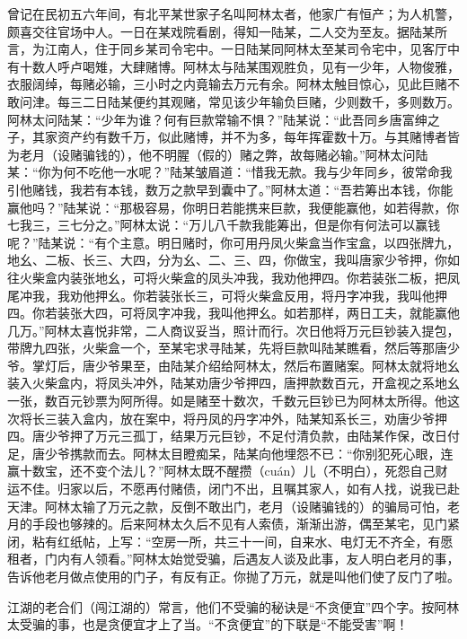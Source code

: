 \documentclass[12pt,UTF8]{ctexbook}
\begin{document}
曾记在民初五六年间，有北平某世家子名叫阿林太者，他家广有恒产；为人机警，颇喜交往官场中人。一日在某戏院看剧，得知一陆某，二人交为至友。据陆某所言，为江南人，住于同乡某司令宅中。一日陆某同阿林太至某司令宅中，见客厅中有十数人呼卢喝雉，大肆赌博。阿林太与陆某围观胜负，见有一少年，人物俊雅，衣服阔绰，每赌必输，三小时之内竟输去万元有余。阿林太触目惊心，见此巨赌不敢问津。每三二日陆某便约其观赌，常见该少年输负巨赌，少则数千，多则数万。阿林太问陆某：“少年为谁？何有巨款常输不惧？”陆某说：“此吾同乡唐富绅之子，其家资产约有数千万，似此赌博，并不为多，每年挥霍数十万。与其赌博者皆为老月（设赌骗钱的），他不明腥（假的）赌之弊，故每赌必输。”阿林太问陆某：“你为何不吃他一水呢？”陆某皱眉道：“惜我无款。我与少年同乡，彼常命我引他赌钱，我若有本钱，数万之款早到囊中了。”阿林太道：“吾若筹出本钱，你能赢他吗？”陆某说：“那极容易，你明日若能携来巨款，我便能赢他，如若得款，你七我三，三七分之。”阿林太说：“万儿八千款我能筹出，但是你有何法可以赢钱呢？”陆某说：“有个主意。明日赌时，你可用丹凤火柴盒当作宝盒，以四张牌九，地幺、二板、长三、大四，分为幺、二、三、四，你做宝，我叫唐家少爷押，你如往火柴盒内装张地幺，可将火柴盒的凤头冲我，我劝他押四。你若装张二板，把凤尾冲我，我劝他押幺。你若装张长三，可将火柴盒反用，将丹字冲我，我叫他押四。你若装张大四，可将凤字冲我，我叫他押幺。如若那样，两日工夫，就能赢他几万。”阿林太喜悦非常，二人商议妥当，照计而行。次日他将万元巨钞装入提包，带牌九四张，火柴盒一个，至某宅求寻陆某，先将巨款叫陆某瞧看，然后等那唐少爷。掌灯后，唐少爷果至，由陆某介绍给阿林太，然后布置赌案。阿林太就将地幺装入火柴盒内，将凤头冲外，陆某劝唐少爷押四，唐押款数百元，开盒视之系地幺一张，数百元钞票为阿所得。如是赌至十数次，千数元巨钞已为阿林太所得。他这次将长三装入盒内，放在案中，将丹凤的丹字冲外，陆某知系长三，劝唐少爷押四。唐少爷押了万元三孤丁，结果万元巨钞，不足付清负款，由陆某作保，改日付足，唐少爷携款而去。阿林太目瞪痴呆，陆某向他埋怨不已：“你别犯死心眼，连赢十数宝，还不变个法儿？”阿林太既不醒攒（cuán）儿（不明白），死怨自己财运不佳。归家以后，不愿再付赌债，闭门不出，且嘱其家人，如有人找，说我已赴天津。阿林太输了万元之款，反倒不敢出门，老月（设赌骗钱的）的骗局可怕，老月的手段也够辣的。后来阿林太久后不见有人索债，渐渐出游，偶至某宅，见门紧闭，粘有红纸帖，上写：“空房一所，共三十一间，自来水、电灯无不齐全，有愿租者，门内有人领看。”阿林太始觉受骗，后遇友人谈及此事，友人明白老月的事，告诉他老月做点使用的门子，有反有正。你抛了万元，就是叫他们使了反门了啦。

江湖的老合们（闯江湖的）常言，他们不受骗的秘诀是“不贪便宜”四个字。按阿林太受骗的事，也是贪便宜才上了当。“不贪便宜”的下联是“不能受害”啊！
\end{document}
